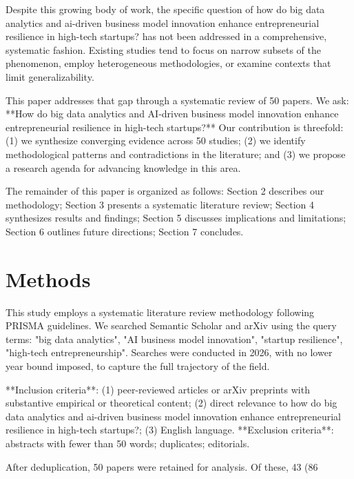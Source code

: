 \documentclass[11pt, a4paper]{article}
\begin{document}
Despite this growing body of work, the specific question of how do big data analytics and ai-driven business model innovation enhance entrepreneurial resilience in high-tech startups? has not been addressed in a comprehensive, systematic fashion. Existing studies tend to focus on narrow subsets of the phenomenon, employ heterogeneous methodologies, or examine contexts that limit generalizability.

This paper addresses that gap through a systematic review of 50 papers. We ask: **How do big data analytics and AI-driven business model innovation enhance entrepreneurial resilience in high-tech startups?** Our contribution is threefold: (1) we synthesize converging evidence across 50 studies; (2) we identify methodological patterns and contradictions in the literature; and (3) we propose a research agenda for advancing knowledge in this area.

The remainder of this paper is organized as follows: Section 2 describes our methodology; Section 3 presents a systematic literature review; Section 4 synthesizes results and findings; Section 5 discusses implications and limitations; Section 6 outlines future directions; Section 7 concludes.

\section{Methods}
This study employs a systematic literature review methodology following PRISMA guidelines. We searched Semantic Scholar and arXiv using the query terms: "big data analytics", "AI business model innovation", "startup resilience", "high-tech entrepreneurship". Searches were conducted in 2026, with no lower year bound imposed, to capture the full trajectory of the field.

**Inclusion criteria**: (1) peer-reviewed articles or arXiv preprints with substantive empirical or theoretical content; (2) direct relevance to how do big data analytics and ai-driven business model innovation enhance entrepreneurial resilience in high-tech startups?; (3) English language. **Exclusion criteria**: abstracts with fewer than 50 words; duplicates; editorials.

After deduplication, 50 papers were retained for analysis. Of these, 43 (86%
\end{document}
